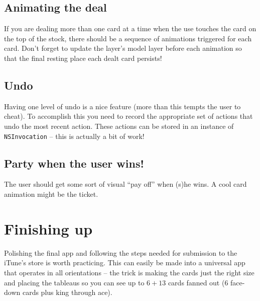 \documentclass[11pt]{article}
\begin{document}
\subsection{Animating the deal}

If you are dealing more than one card at a time when 
the use touches the card on the top of the stock, there
should be a sequence of animations triggered
for each card. Don't forget to update the layer's model
layer before each animation so that the final resting
place each dealt card persists!

\subsection{Undo}

Having one level of undo is a nice feature (more than this tempts
the user to cheat). To accomplish this you need to
record the appropriate set of actions that undo the most
recent action. These actions can be stored in
an instance of {\tt NSInvocation} 
-- this is actually a bit of work!

\subsection{Party when the user wins!}

The user should get some sort of visual ``pay off'' when
(s)he wins. A cool card animation might be the ticket.

\section{Finishing up}

Polishing the final app and following the steps needed
for submission to the iTune's store is worth practicing.
This can easily be made into a universal app that operates
in all orientations -- the trick
is making the cards just the right size and placing the
tableaus so you can see up to $6 + 13$ cards fanned out
(6 face-down cards plus king through ace).
\end{document}
